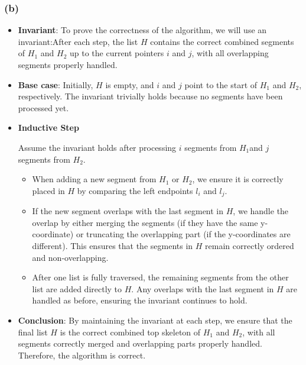 \documentclass[12pt]{article}
\begin{document}
        \subsubsection*{(b)}
            \begin{itemize}

                \item \textbf{Invariant}: To prove the correctness of the algorithm, we will use an invariant:After each step, the list \( H \) contains the correct combined segments of \( H_1 \) and \( H_2 \) up to the current pointers \( i \) and \( j \), with all overlapping segments properly handled.

                \item \textbf{Base case}: Initially, \( H \) is empty, and \( i \) and \( j \) point to the start of \( H_1 \) and \( H_2 \), respectively. The invariant trivially holds because no segments have been processed yet.

                \item \textbf{Inductive Step}

                Assume the invariant holds after processing \( i \) segments from \( H_1 \)and \( j \) segments from \( H_2 \).

                \begin{itemize}
                    \item When adding a new segment from \( H_1 \) or \( H_2 \), we ensure it is correctly placed in \( H \) by comparing the left endpoints \( l_i \) and \( l_j \).
                    \item If the new segment overlaps with the last segment in \( H \), we handle the overlap by either merging the segments (if they have the same y-coordinate) or truncating the overlapping part (if the y-coordinates are different). This ensures that the segments in \( H \) remain correctly ordered and non-overlapping.
                    \item After one list is fully traversed, the remaining segments from the other list are added directly to \( H \). Any overlaps with the last segment in \( H \) are handled as before, ensuring the invariant continues to hold.
                \end{itemize}

                \item \textbf{Conclusion}: By maintaining the invariant at each step, we ensure that the final list \( H \) is the correct combined top skeleton of \( H_1 \) and \( H_2 \), with all segments correctly merged and overlapping parts properly handled. Therefore, the algorithm is correct.
            \end{itemize}
\end{document}
